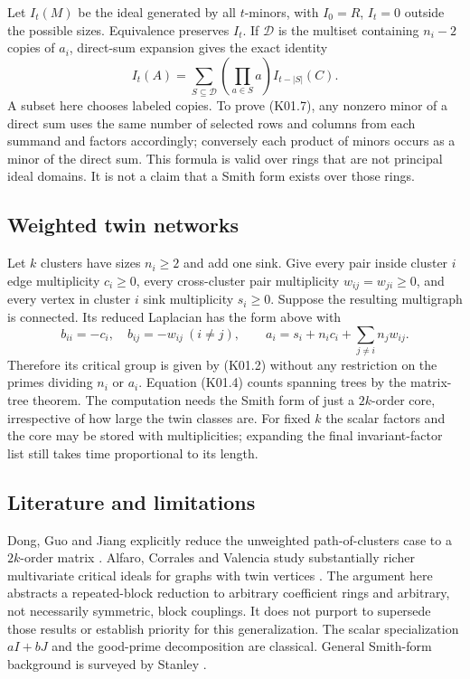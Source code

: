 \documentclass[11pt,a4paper]{article}
\theoremstyle{definition}\newtheorem{definition}[theorem]{Definition}
\theoremstyle{remark}\newtheorem{remark}[theorem]{Remark}
\numberwithin{equation}{section}
\begin{document}
Let $I_t(M)$ be the ideal generated by all $t$-minors, with $I_0=R$, $I_t=0$ outside the possible sizes. Equivalence preserves $I_t$. If $\mathcal D$ is the multiset containing $n_i-2$ copies of $a_i$, direct-sum expansion gives the exact identity
\[
 I_t(A)=\sum_{S\subseteq\mathcal D}\left(\prod_{a\in S}a\right) I_{t-|S|}(C). \tag{K01.7}
\]
A subset here chooses labeled copies. To prove (K01.7), any nonzero minor of a direct sum uses the same number of selected rows and columns from each summand and factors accordingly; conversely each product of minors occurs as a minor of the direct sum. This formula is valid over rings that are not principal ideal domains. It is not a claim that a Smith form exists over those rings.

\subsection{Weighted twin networks}\label{K01-sec-4}
Let $k$ clusters have sizes $n_i\geq2$ and add one sink. Give every pair inside cluster $i$ edge multiplicity $c_i\geq0$, every cross-cluster pair multiplicity $w_{ij}=w_{ji}\geq0$, and every vertex in cluster $i$ sink multiplicity $s_i\geq0$. Suppose the resulting multigraph is connected. Its reduced Laplacian has the form above with
\[
 b_{ii}=-c_i,\quad b_{ij}=-w_{ij}\ (i\ne j),\qquad
 a_i=s_i+n_ic_i+\sum_{j\ne i}n_jw_{ij}.                         \tag{K01.8}
\]
Therefore its critical group is given by (K01.2) without any restriction on the primes dividing $n_i$ or $a_i$. Equation (K01.4) counts spanning trees by the matrix-tree theorem. The computation needs the Smith form of just a $2k$-order core, irrespective of how large the twin classes are. For fixed $k$ the scalar factors and the core may be stored with multiplicities; expanding the final invariant-factor list still takes time proportional to its length.

\subsection{Literature and limitations}\label{K01-sec-5}
Dong, Guo and Jiang explicitly reduce the unweighted path-of-clusters case to a $2k$-order matrix \cite{ref028}. Alfaro, Corrales and Valencia study substantially richer multivariate critical ideals for graphs with twin vertices \cite{ref029}. The argument here abstracts a repeated-block reduction to arbitrary coefficient rings and arbitrary, not necessarily symmetric, block couplings. It does not purport to supersede those results or establish priority for this generalization. The scalar specialization $aI+bJ$ and the good-prime decomposition are classical. General Smith-form background is surveyed by Stanley \cite{ref030}.
\end{document}
